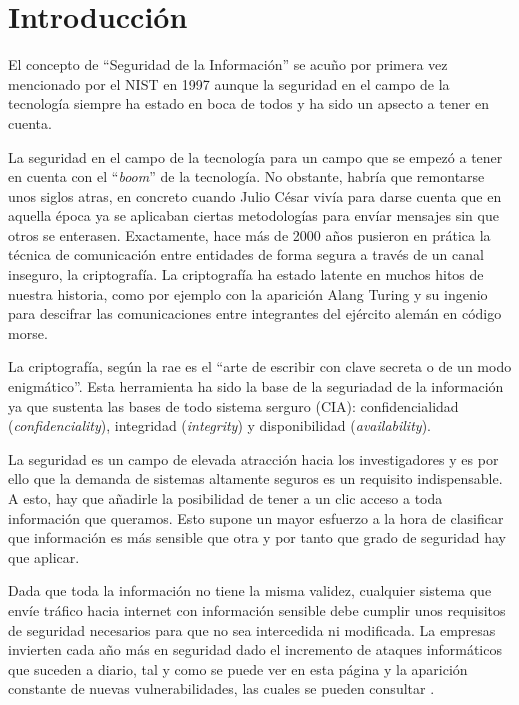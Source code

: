 \cleardoublepage

\chapter{Introducción}

El concepto de ``Seguridad de la Información'' se acuño por primera vez mencionado por el NIST en 1997 \cite{neumann1977post}
aunque la seguridad en el campo de la tecnología siempre ha estado en boca de todos y ha sido un apsecto a tener en cuenta. 

La seguridad en el campo de la tecnología para un campo que se empezó a tener en cuenta con el ``\textit{boom}'' de la 
tecnología. No obstante, habría que remontarse unos siglos atras, en concreto cuando Julio César vivía para darse cuenta que en 
aquella época ya se aplicaban ciertas metodologías para envíar mensajes sin que otros se enterasen. Exactamente, hace más de 
2000 años pusieron en prática la técnica de comunicación entre entidades de forma segura a través de un canal inseguro, la 
criptografía. La criptografía ha estado latente en muchos hitos de nuestra historia, como por ejemplo con la aparición Alang 
Turing y su ingenio para descifrar las comunicaciones entre integrantes del ejército alemán en código morse.

La criptografía, según la \acrfull{rae} es el ``arte de escribir con clave secreta o de un modo enigmático''. Esta herramienta
ha sido la base de la seguriadad de la información ya que sustenta las bases de todo sistema serguro (CIA): confidencialidad 
(\textit{confidenciality}), integridad (\textit{integrity}) y disponibilidad (\textit{availability}).

La seguridad es un campo de elevada atracción hacia los investigadores y es por ello que la demanda de sistemas altamente seguros
es un requisito indispensable. A esto, hay que añadirle la posibilidad de tener a un clic acceso a toda información que queramos.
Esto supone un mayor esfuerzo a la hora de clasificar que información es más sensible que otra y por tanto que grado de seguridad
hay que aplicar. 

Dada que toda la información no tiene la misma validez, cualquier sistema que envíe tráfico hacia internet con información sensible
debe cumplir unos requisitos de seguridad necesarios para que no sea intercedida ni modificada. La empresas invierten cada año
más en seguridad dado el incremento de ataques informáticos que suceden a diario, tal y como se puede ver 
en esta página \cite{digital_attack} y la aparición constante de nuevas vulnerabilidades, las cuales se pueden consultar 
\cite{cve_mitre}.

